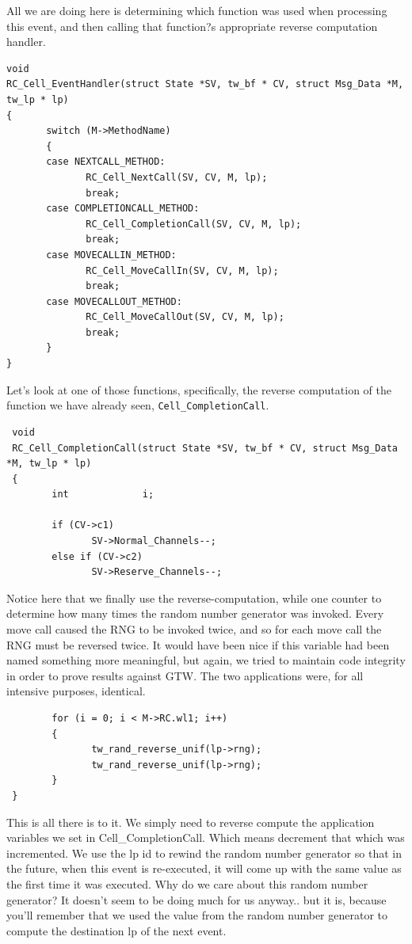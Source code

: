 \documentclass[12pt]{article}
\begin{document}
All we are doing here is determining which function was used when
processing this event, and then calling that function?s appropriate
reverse computation handler.
 
\begin{verbatim}
void
RC_Cell_EventHandler(struct State *SV, tw_bf * CV, struct Msg_Data *M, tw_lp * lp)
{
       switch (M->MethodName)
       {
       case NEXTCALL_METHOD:
              RC_Cell_NextCall(SV, CV, M, lp);
              break;
       case COMPLETIONCALL_METHOD:
              RC_Cell_CompletionCall(SV, CV, M, lp);
              break;
       case MOVECALLIN_METHOD:
              RC_Cell_MoveCallIn(SV, CV, M, lp);
              break;
       case MOVECALLOUT_METHOD:
              RC_Cell_MoveCallOut(SV, CV, M, lp);
              break;
       }
}
\end{verbatim}
 
Let's look at one of those functions, specifically, the reverse
computation of the function we have already seen, {\tt Cell\_CompletionCall}.

\begin{verbatim}
 void
 RC_Cell_CompletionCall(struct State *SV, tw_bf * CV, struct Msg_Data *M, tw_lp * lp)
 {
        int             i;

        if (CV->c1)
               SV->Normal_Channels--;
        else if (CV->c2)
               SV->Reserve_Channels--;
\end{verbatim}
 
Notice here that we finally use the reverse-computation, while one
counter to determine how many times the random number generator was
invoked.  Every move call caused the RNG to be invoked twice, and so
for each move call the RNG must be reversed twice.  It would have been
nice if this variable had been named something more meaningful, but
again, we tried to maintain code integrity in order to prove results
against GTW.  The two applications were, for all intensive purposes,
identical.

\begin{verbatim}
        for (i = 0; i < M->RC.wl1; i++)
        {
               tw_rand_reverse_unif(lp->rng);
               tw_rand_reverse_unif(lp->rng);
        }
 }
\end{verbatim}
 
This is all there is to it.  We simply need to reverse compute the
application variables we set in Cell\_CompletionCall.  Which means
decrement that which was incremented.  We use the lp id to rewind the
random number generator so that in the future, when this event is
re-executed, it will come up with the same value as the first time it
was executed.  Why do we care about this random number generator?  It
doesn't seem to be doing much for us anyway.. but it is, because
you'll remember that we used the value from the random number
generator to compute the destination lp of the next event.
 
\end{document}
